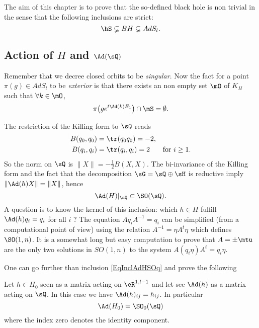 The aim of this chapter is to prove that the so-defined black hole is non trivial in the sense that the following inclusions are strict:
\begin{equation}		\label{EqhSssubBH}
    \hS\varsubsetneq BH\varsubsetneq AdS_l.
\end{equation}

\subsection{Action of \texorpdfstring{$H$}{H} and \texorpdfstring{$\Ad(\sQ)$}{AdQ}}

Remember that we decree closed orbits to be \emph{singular}. Now the fact for a point $\pi(g)\in AdS_l$ to be \emph{exterior} is that there exists an non empty set $\mO$ of $K_H$ such that $\forall k\in\mO$,
\[
  \pi\big( g e^{t\Ad(k)E_1}  \big)\cap\mS=\emptyset.
\]

The restriction of the Killing form to $\sQ$ reads
\begin{subequations}
\begin{align}
	B(q_0,q_0)&=\tr(q_0q_0)=-2,\\
	B(q_{i},q_{i})&=\tr(q_{i},q_{i})=2&\textrm{for $i\geq 1$}.
\end{align}
\end{subequations}
So the norm on $\sQ$ is $\| X \|=-\frac{ 1 }{2}B(X,X)$. The bi-invariance of the Killing form and the fact that the decomposition $\sG=\sQ\oplus\sH$ is reductive  imply $\| \Ad(h)X \|=\| X \|$, hence
\begin{equation}  \label{EqInclAdHSOq}
  \Ad(H)|_{\sQ}\subset\SO(\sQ).
\end{equation} 
A question is to know the kernel of this inclusion: which $h\in H$ fulfill $\Ad(h)q_i=q_i$ for all $i$ ? The equation $Aq_iA^{-1}=q_i$ can be simplified (from a computational point of view) using the relation $A^{-1}=\eta A^t\eta$ which defines $\SO(1,n)$. It is a somewhat long but easy computation to prove that $A=\pm\mtu$ are the only two solutions in $SO(1,n)$ to the system $A(q_i\eta)A^t=q_i\eta$.

One can go further than inclusion \eqref{EqInclAdHSOq} and prove the following
\begin{proposition}		
 Let $h\in H_0$ seen as a matrix acting on $\eR^{1,l-1}$ and let see $\Ad(h)$ as a matrix acting on $\sQ$. In this case we have $\Ad(h)_{ij}=h_{ij}$. In particular
\begin{equation}
   \Ad(H_0)=\SO_0(\sQ)
\end{equation} 
where the index zero denotes the identity component.
\label{PropSOADHequal}
\end{proposition}

